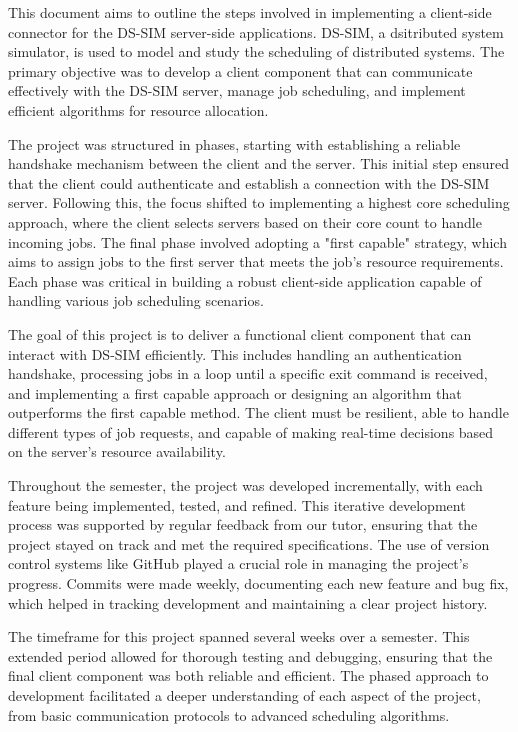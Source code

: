 
This document aims to outline the steps involved in implementing a client-side connector for the DS-SIM server-side applications. DS-SIM, a dsitributed system simulator, is used to model and study the scheduling of distributed systems. The primary objective was to develop a client component that can communicate effectively with the DS-SIM server, manage job scheduling, and implement efficient algorithms for resource allocation.

The project was structured in phases, starting with establishing a reliable handshake mechanism between the client and the server. This initial step ensured that the client could authenticate and establish a connection with the DS-SIM server. Following this, the focus shifted to implementing a highest core scheduling approach, where the client selects servers based on their core count to handle incoming jobs. The final phase involved adopting a "first capable" strategy, which aims to assign jobs to the first server that meets the job's resource requirements. Each phase was critical in building a robust client-side application capable of handling various job scheduling scenarios.

The goal of this project is to deliver a functional client component that can interact with DS-SIM efficiently. This includes handling an authentication handshake, processing jobs in a loop until a specific exit command is received, and implementing a first capable approach or designing an algorithm that outperforms the first capable method. The client must be resilient, able to handle different types of job requests, and capable of making real-time decisions based on the server's resource availability.

Throughout the semester, the project was developed incrementally, with each feature being implemented, tested, and refined. This iterative development process was supported by regular feedback from our tutor, ensuring that the project stayed on track and met the required specifications. The use of version control systems like GitHub played a crucial role in managing the project's progress. Commits were made weekly, documenting each new feature and bug fix, which helped in tracking development and maintaining a clear project history.

The timeframe for this project spanned several weeks over a semester. This extended period allowed for thorough testing and debugging, ensuring that the final client component was both reliable and efficient. The phased approach to development facilitated a deeper understanding of each aspect of the project, from basic communication protocols to advanced scheduling algorithms.